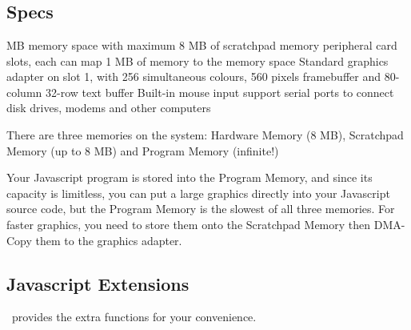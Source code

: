 \chapter{\thismachine}

\section{Specs}

\begin{outline}
 MB memory space with maximum 8 MB of scratchpad memory
 peripheral card slots, each can map 1 MB of memory to the memory space
\1 Standard graphics adapter on slot 1, with 256 simultaneous colours, 560 pixels framebuffer and 80-column 32-row text buffer
\1 Built-in mouse input support
 serial ports to connect disk drives, modems and other computers
\end{outline}

There are three memories on the system: Hardware Memory (8 MB), Scratchpad Memory (up to 8 MB) and Program Memory (infinite!)

Your Javascript program is stored into the Program Memory, and since its capacity is limitless, you can put a large graphics directly into your Javascript source code, but the Program Memory is the slowest of all three memories. For faster graphics, you need to store them onto the Scratchpad Memory then DMA-Copy them to the graphics adapter.

\section{Javascript Extensions}

\thismachine\ provides the extra functions for your convenience.

\begin{outline}
\1
\1
\1
\1
\1
\1
\1
\end{outline}



